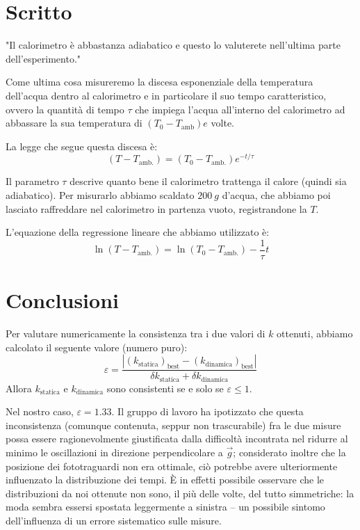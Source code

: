 \documentclass{article}
\begin{document}
\section{Scritto}
    "Il calorimetro è abbastanza adiabatico e questo lo valuterete nell'ultima parte
    dell'esperimento."


    Come ultima cosa misureremo la discesa esponenziale della temperatura dell'acqua
    dentro al calorimetro e in particolare il suo tempo caratteristico, ovvero la quantità
    di tempo $\tau$ che impiega l'acqua all'interno del calorimetro ad abbassare la sua
    temperatura di $(T_0 - T_\text{amb})e$ volte.

    La legge che segue questa discesa è: \[(T-T_\text{amb.})=(T_0-T_\text{amb.}) e^{-t/\tau}\]

    Il parametro $\tau$ descrive quanto bene il calorimetro trattenga il calore
    (quindi sia adiabatico). Per misurarlo abbiamo scaldato $\qty{200}{g}$ d'acqua, che abbiamo
    poi lasciato raffreddare nel calorimetro in partenza vuoto, registrandone la $T$.

    L'equazione della regressione lineare che abbiamo utilizzato è:
    \[\ln(T-T_\text{amb.})=\ln(T_0-T_\text{amb.})-\frac{1}{\tau}t\]

\section{Conclusioni}
Per valutare numericamente la consistenza tra i due valori di $k$ ottenuti,
abbiamo calcolato il seguente valore (numero puro):
\[
    \varepsilon =
    \frac{
        \left|\left(k_\text{statica}\right)_\text{best} - \left(k_\text{dinamica}\right)_\text{best}\right|
    }{
        \delta k_\text{statica} + \delta k_\text{dinamica}
    }
\]
Allora $k_\text{statica}$ e $k_\text{dinamica}$ sono consistenti se e solo se $\varepsilon \le 1$.

Nel nostro caso, $\varepsilon = 1.33$. Il gruppo di lavoro ha ipotizzato che
questa inconsistenza (comunque contenuta, seppur non trascurabile) fra le due
misure possa essere ragionevolmente giustificata dalla difficoltà incontrata
nel ridurre al minimo le oscillazioni in direzione perpendicolare a $\vec{g}$;
considerato inoltre che la posizione dei fototraguardi non era ottimale, ciò
potrebbe avere ulteriormente influenzato la distribuzione dei tempi. È in
effetti possibile osservare che le distribuzioni da noi ottenute non sono,
il più delle volte, del tutto simmetriche: la moda sembra essersi spostata
leggermente a sinistra – un possibile sintomo dell'influenza di un
errore sistematico sulle misure.
\end{document}
